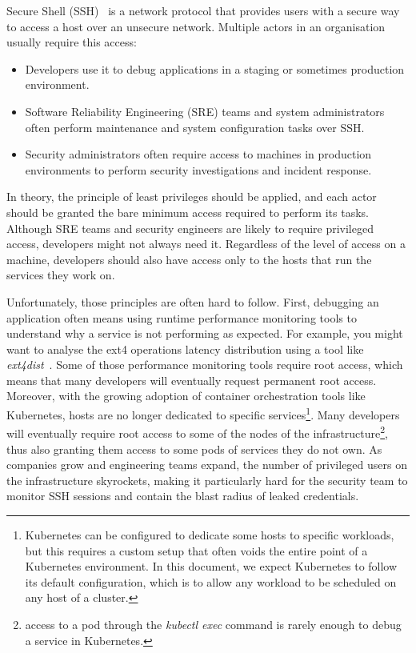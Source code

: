 Secure Shell (SSH)~\cite{MonitoringAndProtectingSSHSessionsWithEBPF:SSH} is a network protocol that provides users with a secure way to access a host over an unsecure network.
Multiple actors in an organisation usually require this access:

\begin{itemize}
  \item Developers use it to debug applications in a staging or sometimes production environment.
  \item Software Reliability Engineering (SRE) teams and system administrators often perform maintenance and system configuration tasks over SSH\@.
  \item Security administrators often require access to machines in production environments to perform security investigations and incident response.
\end{itemize}

In theory, the principle of least privileges should be applied, and each actor should be granted the bare minimum access required to perform its tasks.
Although SRE teams and security engineers are likely to require privileged access, developers might not always need it.
Regardless of the level of access on a machine, developers should also have access only to the hosts that run the services they work on.

Unfortunately, those principles are often hard to follow.
First, debugging an application often means using runtime performance monitoring tools to understand why a service is not performing as expected.
For example, you might want to analyse the ext4 operations latency distribution using a tool like \emph{ext4dist}~\cite{MonitoringAndProtectingSSHSessionsWithEBPF:Ext4}.
Some of those performance monitoring tools require root access, which means that many developers will eventually request permanent root access.
Moreover, with the growing adoption of container orchestration tools like Kubernetes, hosts are no longer dedicated to specific services\footnote{Kubernetes can be configured to dedicate some hosts to specific workloads, but this requires a custom setup that often voids the entire point of a Kubernetes environment.
In this document, we expect Kubernetes to follow its default configuration, which is to allow any workload to be scheduled on any host of a cluster.}.
Many developers will eventually require root access to some of the nodes of the infrastructure\footnote{access to a pod through the \emph{kubectl exec} command is rarely enough to debug a service in Kubernetes.}, thus also granting them access to some pods of services they do not own.
As companies grow and engineering teams expand, the number of privileged users on the infrastructure skyrockets, making it particularly hard for the security team to monitor SSH sessions and contain the blast radius of leaked credentials.

